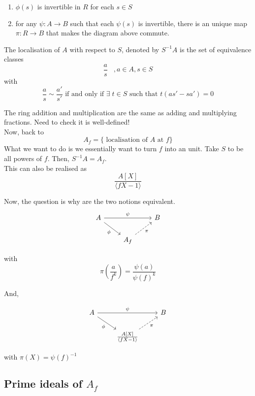 \documentclass[oneside, 12pt]{scrbook}
\theoremstyle{theorem}
\begin{document}
\begin{enumerate}
\item $\phi(s)$ is invertible in $R$ for each $s\in S$
\item for any $\psi : A \rightarrow B$ such that each $\psi (s)$ is invertible, there is an unique map $\pi : R \rightarrow B$ that makes the diagram above commute.
\end{enumerate}

\begin{definition}
The localisation of $A$ with respect to $S$, denoted by $S^{-1}A$ is the set of equivalence classes $$\frac{a}{s} \;\;\;, a \in A , s \in S$$ with $$\frac{a}{s} \sim \frac{a'}{s'} \text{ if and only if } \exists \; t \in S \text{ such that } t (as' - sa')=0$$ 
\end{definition}

The ring addition and multiplication are the same as adding and multiplying fractions. Need to check it is well-defined!\\

Now, back to $$A_{f} = \{\text{ localisation of $A$ at }f\}$$ What we want to do is we essentially want to turn $f$ into an unit. Take $S$ to be all powers of $f$. Then, $S^{-1}A = A_{f}$. \\

This can also be realised as $$\frac{A[X]}{\langle fX-1 \rangle}$$

Now, the question is why are the two notions equivalent. 
\[\begin{tikzcd}
	A && B \\
	& {A_{f}}
	\arrow["\psi", from=1-1, to=1-3]
	\arrow["\phi"', from=1-1, to=2-2]
	\arrow["\pi"', dashed, from=2-2, to=1-3]
\end{tikzcd}\]

with $$\pi\left( \frac{a}{f^k} \right) = \frac{\psi (a)}{\psi (f)^k}$$

And, 

\[\begin{tikzcd}
	A && B \\
	& {\frac{A[X]}{\langle fX - 1 \rangle}}
	\arrow["\psi", from=1-1, to=1-3]
	\arrow["\phi"', from=1-1, to=2-2]
	\arrow["\pi"', dashed, from=2-2, to=1-3]
\end{tikzcd}\]

with $\pi(X) = \psi(f)^{-1}$ \\

\subsection{Prime ideals of $A_{f}$}
\end{document}
